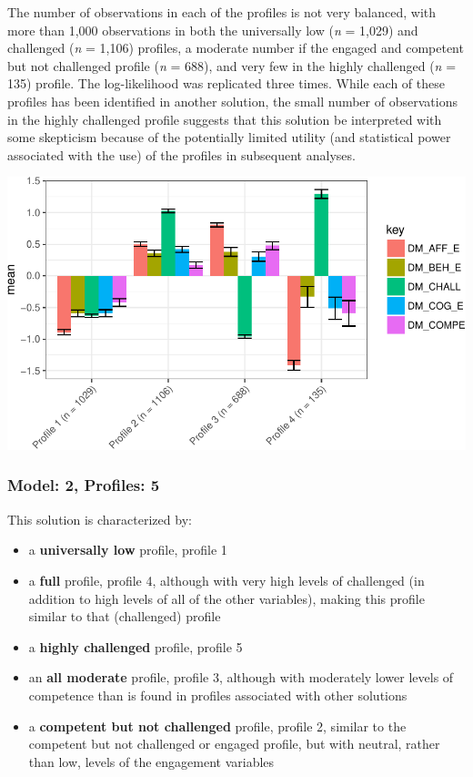 \documentclass[]{msu-thesis}
\providecommand{\tightlist}{%
  \setlength{\itemsep}{0pt}\setlength{\parskip}{0pt}}
\theoremstyle{definition}
\theoremstyle{definition}
\theoremstyle{definition}
\theoremstyle{remark}
\begin{document}
The number of observations in each of the profiles is not very balanced,
with more than 1,000 observations in both the universally low (\emph{n}
= 1,029) and challenged (\emph{n} = 1,106) profiles, a moderate number
if the engaged and competent but not challenged profile (\emph{n} =
688), and very few in the highly challenged (\emph{n} = 135) profile.
The log-likelihood was replicated three times. While each of these
profiles has been identified in another solution, the small number of
observations in the highly challenged profile suggests that this
solution be interpreted with some skepticism because of the potentially
limited utility (and statistical power associated with the use) of the
profiles in subsequent analyses.

\begin{center}\includegraphics[width=0.8\linewidth]{rosenberg-dissertation_files/figure-latex/m2_4p-1} \end{center}

\subsubsection{Model: 2, Profiles: 5}\label{model-2-profiles-5}

This solution is characterized by:

\begin{itemize}
\tightlist
\item
  a \textbf{universally low} profile, profile 1
\item
  a \textbf{full} profile, profile 4, although with very high levels of
  challenged (in addition to high levels of all of the other variables),
  making this profile similar to that (challenged) profile
\item
  a \textbf{highly challenged} profile, profile 5
\item
  an \textbf{all moderate} profile, profile 3, although with moderately
  lower levels of competence than is found in profiles associated with
  other solutions
\item
  a \textbf{competent but not challenged} profile, profile 2, similar to
  the competent but not challenged or engaged profile, but with neutral,
  rather than low, levels of the engagement variables
\end{itemize}
\end{document}
